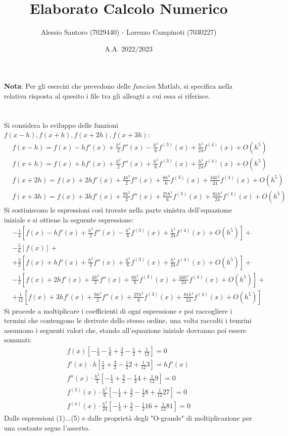 \documentclass[10pt,a4paper]{article}
\author{Alessio Santoro (7029440) - Lorenzo Campinoti (7030227)}
\title{Elaborato Calcolo Numerico}
\date{A.A. 2022/2023}
\begin{document}
\maketitle 	
\textbf{Nota}: Per gli esercizi che prevedono delle \textit{funcion} Matlab, si specifica nella relativa risposta al quesito i file tra gli alleagti a cui essa si riferisce.
\section{}
Si considera lo sviluppo delle funzioni $f(x-h), f(x+h), f(x+2h), f(x+3h)$:
\begin{align*}
&f(x-h)=f(x)-hf'(x)+\frac{h^2}{2}f''(x)-\frac{h^3}{6}f^{(3)}(x)+\frac{h^4}{24}f^{(4)}(x)+O(h^5)\\&f(x+h)=f(x)+hf'(x)+\frac{h^2}{2}f''(x)+\frac{h^3}{6}f^{(3)}(x)+\frac{h^4}{24}f^{(4)}(x)+O(h^5)\\&f(x+2h)=f(x)+2hf'(x)+\frac{4h^2}{2}f''(x)+\frac{8h^3}{6}f^{(3)}(x)+\frac{16h^4}{24}f^{(4)}(x)+O(h^5)\\&f(x+3h)=f(x)+3hf'(x)+\frac{9h^2}{2}f''(x)+\frac{27h^3}{6}f^{(3)}(x)+\frac{81h^4}{24}f^{(4)}(x)+O(h^5)
\end{align*}
Si sostiuiscono le espressioni così trovate nella parte sinistra dell'equaziome iniziale e si ottiene la seguente espressione:
\begin{align*}
&-\frac{1}{4}\left[f(x)-hf'(x)+\frac{h^2}{2}f''(x)-\frac{h^3}{6}f^{(3)}(x)+\frac{h^4}{24}f^{(4)}(x)+O(h^5)\right]+\\&-\frac{5}{6}\left[f(x)\right]+\\&+\frac{3}{2}\left[f(x)+hf'(x)+\frac{h^2}{2}f''(x)+\frac{h^3}{6}f^{(3)}(x)+\frac{h^4}{24}f^{(4)}(x)+O(h^5)\right]+\\&-\frac{1}{2}\left[f(x)+2hf'(x)+\frac{4h^2}{2}f''(x)+\frac{8h^3}{6}f^{(3)}(x)+\frac{16h^4}{24}f^{(4)}(x)+O(h^5)\right]+\\&+\frac{1}{12}\left[f(x)+3hf'(x)+\frac{9h^2}{2}f''(x)+\frac{27h^3}{6}f^{(3)}(x)+\frac{81h^4}{24}f^{(4)}(x)+O(h^5)\right]
\end{align*}
Si procede a moltiplicare i coefficienti di ogni espressione e poi raccogliere i termini che contengono le derivate dello stesso ordine, una volta raccolti i temrini assumono i seguenti valori che, stando all'equazione iniziale dovranno poi essere sommati:
\begin{align}
f(x)\left[-\frac{1}{4}-\frac{5}{6}+\frac{3}{2}-\frac{1}{2}+\frac{1}{12}\right]=0\\	f'(x)\cdot h\left[\frac{1}{4}+\frac{3}{2}-\frac{1}{2}2+\frac{1}{12}3\right]=hf'(x)\\f''(x)\cdot\frac{h^2}{2}\left[-\frac{1}{4}+\frac{3}{2}-\frac{1}{2}4+\frac{1}{12}9\right]=0\\f^{(3)}(x)\cdot\frac{h^3}{6}\left[-\frac{1}{4}+\frac{3}{2}-\frac{1}{2}8+\frac{1}{12}27\right]=0\\f^{(4)}(x)\cdot\frac{h^4}{24}\left[-\frac{1}{4}+\frac{3}{2}-\frac{1}{2}16+\frac{1}{12}81\right]=0
\end{align}
Dalle espressioni (1)...(5) e dalle proprietà degli "O-grande" di moltiplicazione per una costante segue l'asserto.
\end{document}
